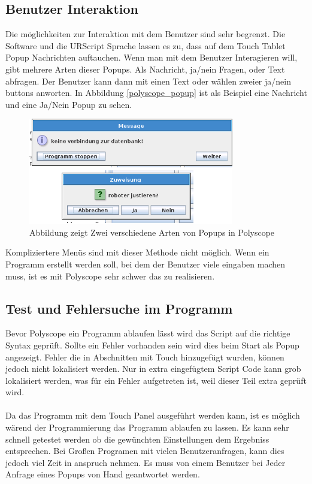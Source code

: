 \subsection{Benutzer Interaktion}
\label{user_interaktion_polyscope_rel}

Die möglichkeiten zur Interaktion mit dem Benutzer sind sehr begrenzt. Die Software und die URScript Sprache lassen es zu, dass auf dem Touch Tablet Popup Nachrichten auftauchen. Wenn man mit dem Benutzer Interagieren will, gibt mehrere Arten dieser Popups.
Als Nachricht, ja/nein Fragen, oder Text abfragen. Der Benutzer kann dann mit einen Text oder wählen zweier ja/nein buttons anworten. In Abbildung \ref{polyscope_popup} 
ist als Beispiel eine Nachricht und eine Ja/Nein Popup zu sehen.

\begin{figure}[H]
  \centering
    \includegraphics[width=0.8\textwidth]{pic/popup_question.png}
      \caption[Popup in Polyscipe]{Abbildung zeigt Zwei verschiedene Arten von Popups in Polyscope}
      \label{fig:polyscope_popup}
\end{figure}

Kompliziertere Menüs sind mit dieser Methode nicht möglich. Wenn ein Programm erstellt werden soll, bei dem der Benutzer viele eingaben machen muss, ist es mit Polyscope sehr schwer das zu realisieren.

\subsection{Test und Fehlersuche im Programm}
\label{debuggin_polyscope_rel}

Bevor Polyscope ein Programm ablaufen lässt wird das Script auf die richtige Syntax geprüft. Sollte ein Fehler vorhanden sein wird dies beim Start als Popup angezeigt. Fehler die in Abschnitten mit Touch hinzugefügt wurden, können jedoch nicht lokalisiert werden. Nur in extra eingefügtem Script Code kann grob lokalisiert werden, was für ein Fehler aufgetreten ist, weil dieser Teil extra geprüft wird.
\\\\
Da das Programm mit dem Touch Panel ausgeführt werden kann, ist es möglich wärend der Programmierung das Programm ablaufen zu lassen. Es kann sehr schnell getestet werden ob die gewünchten Einstellungen dem Ergebniss entsprechen. Bei Großen Programen mit vielen Benutzeranfragen, kann dies jedoch viel Zeit in anspruch nehmen. Es muss von einem Benutzer bei Jeder Anfrage eines Popups von Hand geantwortet werden.

